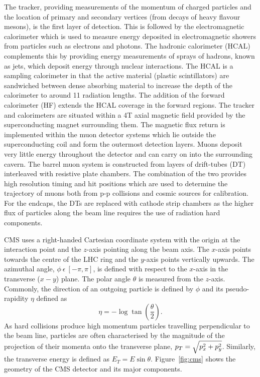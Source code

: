The tracker, providing measurements of the momentum of charged particles and the location of 
primary and secondary vertices (from decays of heavy flavour mesons), is the first layer of detection.
This is followed by the electromagnetic calorimeter which is used to measure
energy deposited in electromagnetic showers from particles such as electrons and photons. 
The hadronic calorimeter (HCAL) complements this by providing energy measurements of 
sprays of hadrons, known as jets, which deposit energy through nuclear interactions. 
The HCAL is a sampling calorimeter in that the active material (plastic scintillators)
are sandwiched between dense absorbing material to increase the depth of the calorimeter to
around 11 radiation lengths. The addition of the forward calorimeter (HF) extends the HCAL
coverage in the forward regions.  
The tracker and calorimeters are situated within a 4T axial magnetic field 
provided by the superconducting magnet surrounding them.
The magnetic flux return is implemented within the  muon detector systems which lie outside 
the superconducting coil and form the outermost detection layers. Muons deposit very little energy 
throughout the detector and can carry on into the surrounding cavern.
The barrel muon system is constructed from layers of drift-tubes (DT) interleaved with 
resistive plate chambers. The combination of the two provides high resolution
timing and hit positions which are used to determine the trajectory of muons both from
p-p collisions and cosmic sources for calibration. For the endcaps, the DTs are replaced
with cathode strip chambers as the higher flux of particles along the beam line
requires the use of radiation hard components.

CMS uses a right-handed Cartesian coordinate system with the origin at the 
interaction point and the $z$-axis pointing along the beam axis. The $x$-axis points towards 
the centre of the LHC ring and the $y$-axis points vertically upwards. The azimuthal angle, 
$\phi~\epsilon~[-\pi,\pi]$, is defined with respect to the $x$-axis in the 
transverse ($x-y$) plane. The polar angle $\theta$ is measured from the $z$-axis. Commonly,
the direction of an outgoing particle is defined by $\phi$ and its pseudo-rapidity $\eta$ 
defined as 
\begin{equation}
	\eta=-\log \tan \left( \frac{\theta}{2} \right).
\end{equation}
As hard collisions produce high momentum particles travelling perpendicular to the beam line, 
particles are often characterised
by the magnitude of the projection of their momenta onto the transverse plane, 
$p_{T}=\sqrt{p_{x}^{2}+p_{y}^{2}}$.
Similarly, the transverse energy is defined as $E_{T}=E\sin\theta$.
Figure~\ref{fig:cms} shows the geometry of the CMS detector and its major components. 

